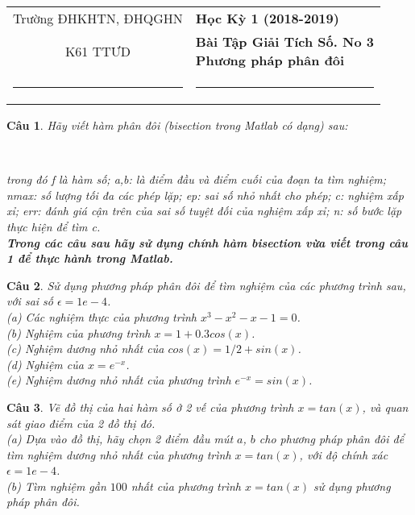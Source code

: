 \documentclass[11pt]{article}
\newtheorem{bt}{Câu}
\begin{document}
\begin{tabular*}
{\linewidth}{c>{\centering\hspace{0pt}} p{}}
Trường ĐHKHTN, ĐHQGHN & {\bf Học Kỳ 1 (2018-2019)}
\tabularnewline
K61 TTƯD & {\bf Bài Tập Giải Tích Số. No 3 \\ Phương pháp phân đôi}
\tabularnewline
\rule{1in}{1pt}  \small  & \rule{2in}{1pt} %
\tabularnewline

\end{tabular*}
%

\begin{bt}
Hãy viết hàm phân đôi (bisection trong Matlab có dạng) sau:
\begin{center}
  \\
\end{center}
trong đó f là hàm số; a,b: là điểm đầu và điểm cuối của đoạn ta tìm nghiệm; nmax: số lượng tối đa các phép lặp; ep: sai số nhỏ nhất cho phép; c: nghiệm xấp xỉ;
err: đánh giá cận trên của sai số tuyệt đối của nghiệm xấp xỉ; n: số bước lặp thực hiện để tìm c.\\
\textbf{Trong các câu sau hãy sử dụng chính hàm bisection vừa viết trong câu 1 để thực hành trong Matlab.}
\end{bt}

\begin{bt} 
Sử dụng phương pháp phân đôi để tìm nghiệm của các phương trình sau, với sai số $\epsilon=1e-4$.\\ 
(a) Các nghiệm thực của phương trình $x^3 - x^2 - x - 1 = 0$. \\
(b) Nghiệm của phương trình $x = 1 + 0.3 cos(x)$. \\
(c) Nghiệm dương nhỏ nhất của $cos(x) = 1/2 + sin (x)$. \\
(d) Nghiệm của $x = e^{-x}$. \\
(e) Nghiệm dương nhỏ nhất của phương trình $e^{-x} = sin(x)$. 
\end{bt}

\begin{bt}
Vẽ đồ thị của hai hàm số ở 2 vế của phương trình $x = tan(x)$, và quan sát giao điểm của 2 đồ thị đó.\\
(a) Dựa vào đồ thị, hãy chọn 2 điểm đầu mút $a$, $b$ cho phương pháp phân đôi để tìm nghiệm dương nhỏ nhất của phương trình $x = tan (x)$, với độ chính xác 
$\epsilon=1e-4$. \\
(b) Tìm nghiệm gần $100$ nhất của phương trình $x = tan(x)$ sử dụng phương pháp phân đôi.
\end{bt}
\end{document}
